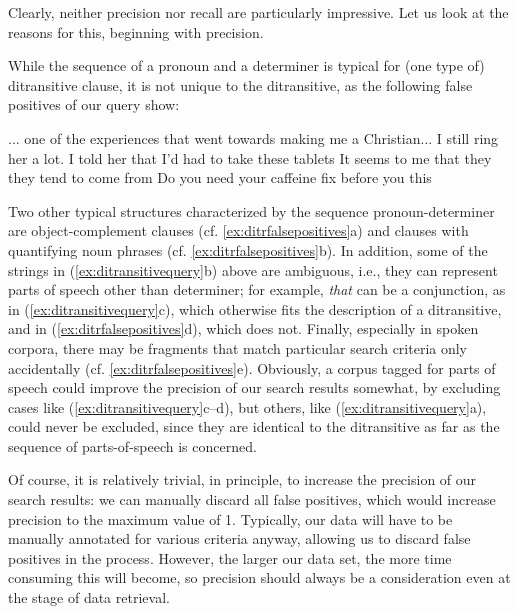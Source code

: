 Clearly, neither precision  nor recall  are particularly impressive. Let us look at the reasons for this, beginning with precision.

While the sequence of a pronoun  and a determiner  is typical for (one type of) ditransitive  clause, it is not unique to the ditransitive, as the following false positives of our query  show:

\begin{exe}
\ex
\begin{xlist}
\label{ex:ditrfalsepositives}
\ex ... one of the experiences that went towards making me a Christian...
\ex I still ring her a lot.
\ex I told her that I'd had to take these tablets
\ex It seems to me that they they tend to come from
\ex Do you need your caffeine fix before you this
\end{xlist}
\end{exe}

Two other typical structures characterized by the sequence pronoun\hyp{}determiner  are object\hyp{}complement  clauses (cf. \ref{ex:ditrfalsepositives}a) and clauses with quantifying noun  phrases (cf. \ref{ex:ditrfalsepositives}b). In addition, some of the strings in (\ref{ex:ditransitivequery}b) above are ambiguous,  i.e., they can represent parts of speech other than determiner;  for example, \textit{that} can be a conjunction,  as in (\ref{ex:ditransitivequery}c),  which otherwise fits the description of a ditransitive,  and in (\ref{ex:ditrfalsepositives}d), which does not. Finally, especially in spoken  corpora, there may be fragments that match particular search criteria only accidentally (cf. \ref{ex:ditrfalsepositives}e). Obviously, a corpus tagged  for parts of speech could improve the precision  of our search results somewhat, by excluding cases like (\ref{ex:ditransitivequery}c--d), but others, like (\ref{ex:ditransitivequery}a), could never be excluded, since they are identical to the ditransitive as far as the sequence of parts\hyp{}of\hyp{}speech is concerned.

Of course, it is relatively trivial, in principle, to increase the precision  of our search results: we can manually  discard all false positives, which would increase precision to the maximum value of 1. Typically, our data will have to be manually annotated  for various criteria anyway, allowing us to discard false positives in the process. However, the larger  our data set, the more time consuming this will become, so precision  should always be a consideration even at the stage of data  retrieval.

